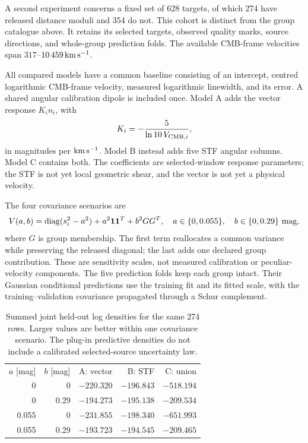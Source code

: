 A second experiment concerns a fixed set of 628 targets, of which 274 have released distance moduli and 354 do not. This cohort is distinct from the group catalogue above. It retains its selected targets, observed quality marks, source directions, and whole-group prediction folds. The available CMB-frame velocities span $317$--$10\,459\,\mathrm{km}\,\mathrm{s}^{-1}$.

All compared models have a common baseline consisting of an intercept, centred logarithmic CMB-frame velocity, measured logarithmic linewidth, and its error. A shared angular calibration dipole is included once. Model A adds the vector response $K_i n_i$, with
\begin{equation}
 K_i=-\frac{5}{\ln10\,V_{{\rm CMB},i}},
 \label{eq:flowcolumn}
\end{equation}
in magnitudes per $\mathrm{km}\,\mathrm{s}^{-1}$. Model B instead adds five STF angular columns. Model C contains both. The coefficients are selected-window response parameters; the STF is not yet local geometric shear, and the vector is not yet a physical velocity.

The four covariance scenarios are
\begin{equation}
 V(a,b)=\operatorname{diag}(s_i^2-a^2)+a^2\bm1\bm1^T+b^2GG^T,
 \quad a\in\{0,0.055\},\quad b\in\{0,0.29\}\ \mathrm{mag},
 \label{eq:distancecov}
\end{equation}
where $G$ is group membership. The first term reallocates a common variance while preserving the released diagonal; the last adds one declared group contribution. These are sensitivity scales, not measured calibration or peculiar-velocity components. The five prediction folds keep each group intact. Their Gaussian conditional predictions use the training fit and its fitted scale, with the training--validation covariance propagated through a Schur complement.

\begin{table}[ht]
\caption{Summed joint held-out log densities for the same 274 rows. Larger values are better within one covariance scenario. The plug-in predictive densities do not include a calibrated selected-source uncertainty law.}
\label{tab:distanceprediction}
\begin{ruledtabular}\begin{tabular}{rrrrr}
$a$ [mag]&$b$ [mag]&A: vector&B: STF&C: union\\
0&0&$-220.320$&$-196.843$&$-518.194$\\
0&0.29&$-194.273$&$-195.138$&$-209.534$\\
0.055&0&$-231.855$&$-198.340$&$-651.993$\\
0.055&0.29&$-193.723$&$-194.545$&$-209.465$
\end{tabular}\end{ruledtabular}
\end{table}

